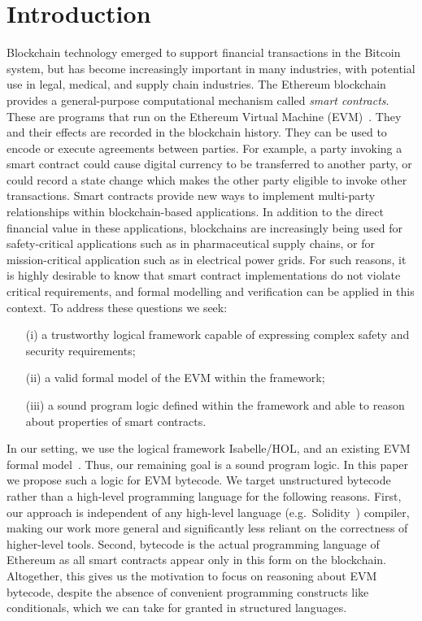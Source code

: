 \documentclass[sigplan,10pt,review]{acmart}\settopmatter{printfolios=true,printccs=false,printacmref=false}
\begin{document}
\section{Introduction}
\label{sec:intro}
Blockchain technology emerged to support financial transactions in the Bitcoin system, but has become
increasingly important in many industries, with potential use in legal, medical, and
supply chain industries.
The Ethereum blockchain provides a general-purpose computational mechanism called \emph{smart contracts}.
These are programs that run on the Ethereum Virtual Machine (EVM)~\cite{wood2014ethereum}. They and their effects 
are recorded in the blockchain history.  They can be used to encode or execute agreements between parties.
For example, a party invoking a smart contract could cause digital currency to be transferred to another
party, or could record a state change which makes the other party eligible to invoke other transactions.
Smart contracts provide new ways to implement multi-party relationships within blockchain-based applications.
In addition to the direct financial value in these applications, blockchains are increasingly being
used for safety-critical applications such as in pharmaceutical supply chains, or for mission-critical
application such as in electrical power grids.
For such reasons, it is highly desirable to know that smart contract implementations do not violate critical requirements, and
formal modelling and verification can be applied in this context.
%
To address these questions we seek:
\begin{itemize}
\item[(i)] a trustworthy logical framework capable of expressing complex safety and security
   requirements; 
\item[(ii)] a valid formal model of the EVM within the framework; 
\item[(iii)] a sound program logic defined within the framework and able to
reason about properties of smart contracts. 
\end{itemize}
In our setting, we use the logical framework Isabelle/HOL, and an existing EVM formal
model~\cite{Yoichi}.
Thus, our remaining goal is a sound program logic.  In this paper we propose such a logic for EVM bytecode. 
We target unstructured bytecode rather than a high-level programming language for the following reasons.
First, our approach is independent of any high-level language (e.g.\ Solidity~\cite{solidity}) compiler, 
making our work more general and significantly less reliant
on the correctness of higher-level tools.
Second, bytecode is the actual programming language of Ethereum as all smart contracts appear only
in this form on the blockchain. 
Altogether, this gives us the motivation to focus on reasoning about EVM bytecode, despite the absence of %
convenient programming constructs like conditionals,
which we can take for granted in structured languages.
\end{document}
